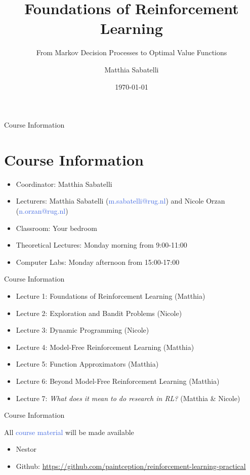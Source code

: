 \documentclass{beamer}
\title{Foundations of Reinforcement Learning}
\subtitle{From Markov Decision Processes to Optimal Value Functions}
\author{Matthia Sabatelli}
\date{\today}
\begin{document}
\frame{\titlepage} 


\begin{frame}{Course Information}
	\section{Course Information}

	\begin{itemize}
		\item Coordinator: Matthia Sabatelli
		\item Lecturers: Matthia Sabatelli (\textcolor{RoyalBlue}{m.sabatelli@rug.nl}) and Nicole Orzan (\textcolor{RoyalBlue}{n.orzan@rug.nl})
		\item Classroom: Your bedroom
		\item Theoretical Lectures: Monday morning from 9:00-11:00
		\item Computer Labs: Monday afternoon from 15:00-17:00
	\end{itemize}

\end{frame}


\begin{frame}{Course Information}

	\begin{itemize}
		\item Lecture 1: Foundations of Reinforcement Learning (Matthia)
		\item Lecture 2: Exploration and Bandit Problems (Nicole)
		\item Lecture 3: Dynamic Programming (Nicole)
		\item Lecture 4: Model-Free Reinforcement Learning (Matthia)
		\item Lecture 5: Function Approximators (Matthia) 
		\item Lecture 6: Beyond Model-Free Reinforcement Learning (Matthia)
		\item Lecture 7: \textit{What does it mean to do research in RL?} (Matthia \& Nicole)
	\end{itemize}

\end{frame}

\begin{frame}{Course Information}

	All \textcolor{RoyalBlue}{course material} will be made available

	\begin{itemize}
		\item Nestor
		\item Github: \url{https://github.com/paintception/reinforcement-learning-practical}
	\end{itemize}

\end{frame}
\end{document}
